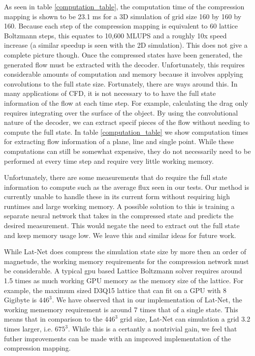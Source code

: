 \documentclass{article}
\begin{document}
As seen in table \ref{computation_table}, the computation time of the compression mapping is shown to be 23.1 ms for a 3D simulation of grid size 160 by 160 by 160. Because each step of the compression mapping is equivalent to 60 lattice Boltzmann steps, this equates to 10,600 MLUPS and a roughly 10x speed increase (a similar speedup is seen with the 2D simulation). This does not give a complete picture though. Once the compressed states have been generated, the generated flow must be extracted with the decoder. Unfortunately, this requires considerable amounts of computation and memory because it involves applying convolutions to the full state size. Fortunately, there are ways around this. In many applications of CFD, it is not necessary to to have the full state information of the flow at each time step. For example, calculating the drag only requires integrating over the surface of the object. By using the convolutional nature of the decoder, we can extract specif pieces of the flow without needing to compute the full state. In table \ref{computation_table} we show computation times for extracting flow information of a plane, line and single point. While these computations can still be somewhat expensive, they do not necessarily need to be performed at every time step and require very little working memory. 

Unfortunately, there are some measurements that do require the full state information to compute such as the average flux seen in our tests. Our method is currently unable to handle these in its current form without requiring high runtimes and large working memory. A possible solution to this is training a separate neural network that takes in the compressed state and predicts the desired measurement. This would negate the need to extract out the full state and keep memory usage low. We leave this and similar ideas for future work.

While Lat-Net does compress the simulation state size by more then an order of magnetude, the working memory requirements for the compression network must be considerable. A typical gpu based Lattice Boltzmann solver requires around 1.5 times as much working GPU memory as the memory size of the lattice. For example, the maximum sized D3Q15 lattice that can fit on a GPU with 8 Gigibyte is $446^3$. We have observed that in our implementation of Lat-Net, the working mememory requirement is around 7 times that of a single state. This means that in comparison to the $446^3$ grid size, Lat-Net can simulation a grid 3.2 times larger, i.e. $675^3$. While this is a certantly a nontrivial gain, we feel that futher improvements can be made with an improved implementation of the compression mapping.
\end{document}
